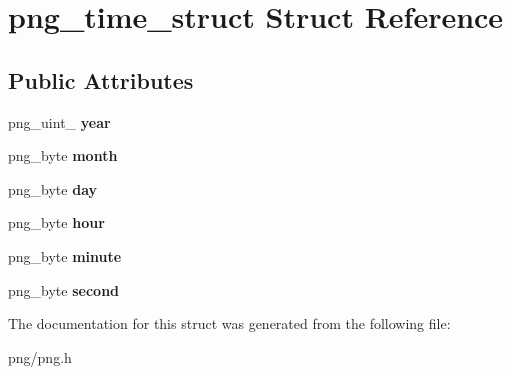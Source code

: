 \hypertarget{structpng__time__struct}{}\section{png\+\_\+time\+\_\+struct Struct Reference}
\label{structpng__time__struct}
\subsection*{Public Attributes}
\begin{DoxyCompactItemize}
\item 
png\+\_\+uint\+\_ {\bfseries year}\hypertarget{structpng__time__struct_a5cceb6213fc7b4462435ea1d8fc1c798}{}\label{structpng__time__struct_a5cceb6213fc7b4462435ea1d8fc1c798}

\item 
png\+\_\+byte {\bfseries month}\hypertarget{structpng__time__struct_a3ab550977ee2cb1165c0398131f2e601}{}\label{structpng__time__struct_a3ab550977ee2cb1165c0398131f2e601}

\item 
png\+\_\+byte {\bfseries day}\hypertarget{structpng__time__struct_afa0f94516a676178d1dabeb96eccdcdb}{}\label{structpng__time__struct_afa0f94516a676178d1dabeb96eccdcdb}

\item 
png\+\_\+byte {\bfseries hour}\hypertarget{structpng__time__struct_a79ac8b217254fd87cdc7299e6612a6f4}{}\label{structpng__time__struct_a79ac8b217254fd87cdc7299e6612a6f4}

\item 
png\+\_\+byte {\bfseries minute}\hypertarget{structpng__time__struct_ad3ce11e9d92b77a33b3f7480bf0fff8c}{}\label{structpng__time__struct_ad3ce11e9d92b77a33b3f7480bf0fff8c}

\item 
png\+\_\+byte {\bfseries second}\hypertarget{structpng__time__struct_a84e528e4c4c7d76cd2252e0d0d2ed0c9}{}\label{structpng__time__struct_a84e528e4c4c7d76cd2252e0d0d2ed0c9}

\end{DoxyCompactItemize}


The documentation for this struct was generated from the following file\+:\begin{DoxyCompactItemize}
\item 
png/png.\+h\end{DoxyCompactItemize}
